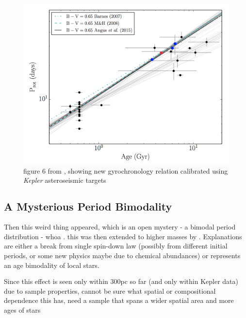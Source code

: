 \documentclass[12pt]{article}
\newcommand{\Kepler}{\textsl{Kepler}\xspace}
\begin{document}
\begin{figure}[!th]
\centering
\includegraphics[width=4.5in]{angus2015_fig6.png}
\caption{figure 6 from \citet{angus2015}, showing new gyrochronology relation calibrated using \Kepler asteroseismic targets
}
\label{fig:gyro}
\end{figure}



\subsection{A Mysterious Period Bimodality}

Then this weird thing appeared, which is an open mystery - a bimodal period distribution - whoa \citep{mcquillan2013}. this was then extended to higher masses by \citet{davenport2017}. Explanations are either a break from single spin-down law (possibly from different initial periods, or some new physics maybe due to chemical abundances) or represents an age bimodality of local stars.

 Since this effect is seen only within 300pc so far (and only within Kepler data) due to sample properties, cannot be sure what spatial or compositional dependence this has, need a sample that spans a wider spatial area and more ages of stars
\end{document}
